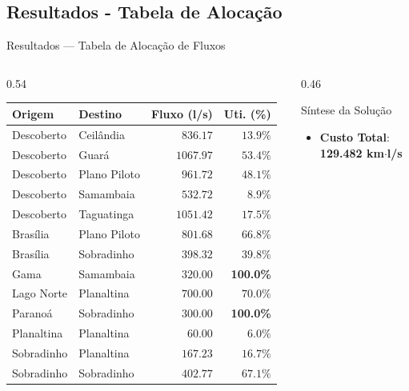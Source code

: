 \subsection{Resultados - Tabela de Alocação}
\begin{frame}{Resultados --- Tabela de Alocação de Fluxos}
  \begin{columns}[t]
    \begin{column}{0.54\textwidth}
      \setlength{\tabcolsep}{1.5pt}
      \begin{table}
        \centering
        \tiny
        \begin{tabular}{llrr}
          \toprule
          \textbf{Origem} & \textbf{Destino} & \textbf{Fluxo (l/s)} & \textbf{Uti. (\%)} \\
          \midrule
          Descoberto & Ceilândia & $836.17$ & $13.9\%$ \\
          Descoberto & Guará & $1067.97$ & $53.4\%$ \\
          Descoberto & Plano Piloto & $961.72$ & $48.1\%$ \\
          Descoberto & Samambaia & $532.72$ & $8.9\%$ \\
          Descoberto & Taguatinga & $1051.42$ & $17.5\%$ \\
          Brasília & Plano Piloto & $801.68$ & $66.8\%$ \\
          Brasília & Sobradinho & $398.32$ & $39.8\%$ \\
          Gama & Samambaia & $320.00$ & \textbf{100.0\%} \\
          Lago Norte & Planaltina & $700.00$ & $70.0\%$ \\
          Paranoá & Sobradinho & $300.00$ & \textbf{100.0\%} \\
          Planaltina & Planaltina & $60.00$ & $6.0\%$ \\
          Sobradinho & Planaltina & $167.23$ & $16.7\%$ \\
          Sobradinho & Sobradinho & $402.77$ & $67.1\%$ \\
          \bottomrule
        \end{tabular}
      \end{table}
    \end{column}
    \begin{column}{0.46\textwidth}
      \begin{block}{Síntese da Solução}
        \begin{itemize}
          \scriptsize
          \item \textbf{Custo Total}: \\ \textbf{129.482 km$\cdot$l/s}

\end{itemize}
\end{block}
\end{column}
\end{columns}
\end{frame}
